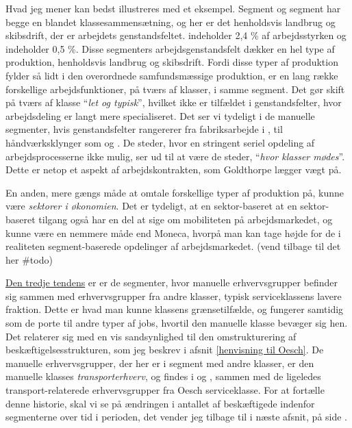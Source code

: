 Hvad jeg mener kan bedst illustreres med et eksempel. Segment  og segment  har begge en blandet  klassesammensætning, og her er det henholdsvis landbrug og skibsdrift, der er arbejdets genstandsfeltet.  indeholder 2,4 \% af arbejdsstyrken og  indeholder 0,5 \%. Disse segmenters arbejdsgenstandsfelt dækker en hel type af produktion, henholdsvis landbrug og skibsdrift. Fordi disse typer af produktion fylder så lidt i den overordnede samfundsmæssige produktion, er en lang række forskellige arbejdsfunktioner, på tværs af klasser, i samme segment. Det gør skift på tværs af klasse “\emph{let og typisk}”, hvilket ikke er tilfældet i genstandsfelter, hvor arbejdsdeling er langt mere specialiseret. 
Det ser vi tydeligt i de manuelle segmenter, hvis genstandsfelter rangererer fra fabriksarbejde i , til håndværksklynger som  og  . De steder, hvor en stringent seriel opdeling af arbejdsprocesserne ikke mulig, ser ud til at være de steder, “\emph{hvor klasser mødes}”. Dette er netop et aspekt af arbejdskontrakten, som Goldthorpe lægger vægt på. %

En anden, mere gængs måde at omtale forskellige typer af produktion på, kunne være \emph{sektorer i økonomien}. Det er tydeligt, at en sektor-baseret at en sektor-baseret tilgang også har en del at sige om mobiliteten på arbejdsmarkedet, og kunne være en nemmere måde end Moneca, hvorpå man kan  tage højde for de i realiteten segment-baserede opdelinger af arbejdsmarkedet. (vend tilbage til det her \#todo)


\underline{Den tredje tendens} er er de segmenter, hvor manuelle erhvervsgrupper befinder sig sammen med erhvervsgrupper fra andre klasser, typisk serviceklassens lavere fraktion. Dette er hvad man kunne klassens grænsetilfælde, og fungerer samtidig som de porte til andre typer af jobs, hvortil den manuelle klasse bevæger sig hen.  Det relaterer sig med en vis sandsynlighed til den omstrukturering af beskæftigelsesstrukturen, som jeg beskrev i afsnit \ref{henvisning til Oesch}.  De manuelle erhvervsgrupper, der her er i segment med andre klasser, er den manuelle klasses \emph{transporterhverv}, og findes i  og , sammen med de ligeledes transport-relaterede erhvervsgrupper fra Oesch serviceklasse. For at fortælle denne historie, skal vi se på ændringen i antallet af beskæftigede indenfor segmenterne over tid i perioden, det vender jeg tilbage til i næste afsnit, på side \pageref{subsec delanalyse3 manuelle arbejdsklasse hvorhen mobilitet}.  %

